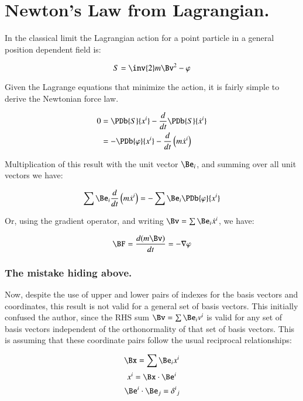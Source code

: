 \chapter{Newton's Law from Lagrangian.}
\date{August 9, 2008.  Last Revision: $Date: 2009/06/04 13:13:27 $ }

In the classical limit the Lagrangian action for a point particle in a general
position dependent field is:

\begin{equation}
S = \inv{2} m\Bv^2 - \varphi
\end{equation}

Given the Lagrange equations that minimize the action, it is fairly simple
to derive the Newtonian force law.

\begin{align*}
0
&= \PDb{S}{x^i} - \frac{d}{dt}\PDb{S}{\dot{x}^i} \\
&= -\PDb{\varphi}{x^i} - \frac{d}{dt}\left(m \dot{x}^i\right)
\end{align*}

Multiplication of this result with the unit vector $\Be_i$, and summing over
all unit vectors we have:

\begin{equation*}
\sum \Be_i \frac{d}{dt}\left(m \dot{x}^i\right) = - \sum \Be_i \PDb{\varphi}{x^i}
\end{equation*}

Or, using the gradient operator, and writing $\Bv = \sum \Be_i \dot{x}^i$, we have:

\begin{equation}
\BF = \frac{d (m \Bv)}{dt} = - \grad \varphi
\end{equation}

\subsection{The mistake hiding above. }

Now, despite the use of upper and lower pairs of indexes for the basis vectors and coordinates, this
result is not valid for a general set of basis vectors.  This initially confused the author, since the RHS
sum $\Bv = \sum \Be_i v^i$ is valid for any set of basis vectors independent of the orthonormality of that
set of basis vectors.  This is assuming that these coordinate pairs follow the usual reciprocal relationships:

\begin{equation*}
\Bx = \sum \Be_i x^i
\end{equation*}
\begin{equation*}
x^i = \Bx \cdot \Be^i
\end{equation*}
\begin{equation*}
\Be^i \cdot \Be_j = {\delta^i}_j
\end{equation*}

